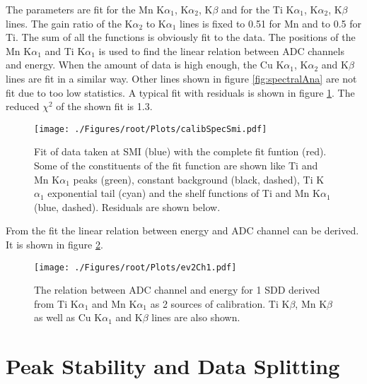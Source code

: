 The parameters are fit for the Mn K$\alpha_{1}$, K$\alpha_{2}$, K$\beta$ and for the Ti K$\alpha_{1}$, K$\alpha_{2}$, K$\beta$ lines. The gain ratio of the K$\alpha_{2}$ to K$\alpha_{1}$ lines is fixed to 0.51 for Mn and to 0.5 for Ti. The sum of all the functions is obviously fit to the data. The positions of the Mn K$\alpha_{1}$ and Ti K$\alpha_{1}$ is used to find the linear relation between ADC channels and energy. When the amount of data is high enough, the Cu K$\alpha_{1}$, K$\alpha_{2}$ and K$\beta$ lines are fit in a similar way. Other lines shown in figure \ref{fig:spectralAna} are not fit due to too low statistics. A typical fit with residuals is shown in figure \ref{fig:fitSdd4Smi}. The reduced $\chi^{2}$ of the shown fit is 1.3.
\begin{figure}[h]
 \centering
 \texttt{[image: ./Figures/root/Plots/calibSpecSmi.pdf]}
 \caption{Fit of data taken at SMI (blue) with the complete fit funtion (red). Some of the constituents of the fit function are shown like Ti and Mn K$\alpha_{1}$ peaks (green), constant background (black, dashed), Ti K$\alpha_{1}$ exponential tail (cyan) and the shelf functions of Ti and Mn K$\alpha_{1}$ (blue, dashed). Residuals are shown below.}
 \label{fig:fitSdd4Smi}
\end{figure}
From the fit the linear relation between energy and ADC channel can be derived. It is shown in figure \ref{fig:ev2ch}.
\begin{figure}[h]
 \centering
 \texttt{[image: ./Figures/root/Plots/ev2Ch1.pdf]}
 \caption{The relation between ADC channel and energy for 1 SDD derived from Ti K$\alpha_{1}$ and Mn K$\alpha_{1}$ as 2 sources of calibration. Ti K$\beta$, Mn K$\beta$ as well as Cu K$\alpha_{1}$ and  K$\beta$ lines are also shown.}
 \label{fig:ev2ch}
\end{figure}


\section{Peak Stability and Data Splitting}

